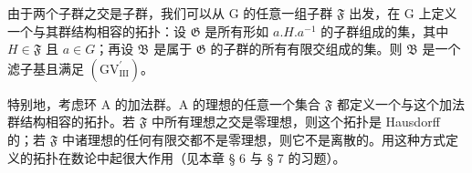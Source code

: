 由于两个子群之交是子群，我们可以从 G 的任意一组子群 \(\mathfrak{F}\) 出发，在 G 上定义一个与其群结构相容的拓扑：设 \(\mathfrak{G}\) 是所有形如 \(a.H.a^{-1}\) 的子群组成的集，其中 \(H\in\mathfrak{F}\) 且 \(a\in G\)；再设 \(\mathfrak{B}\) 是属于 \(\mathfrak{G}\) 的子群的所有有限交组成的集。则 \(\mathfrak{B}\) 是一个滤子基且满足 \((\mathrm{GV}_{\mathrm{III}}^{\prime})\)。

特别地，考虑环 A 的加法群。A 的理想的任意一个集合 \(\mathfrak{F}\) 都定义一个与这个加法群结构相容的拓扑。若 \(\mathfrak{F}\) 中所有理想之交是零理想，则这个拓扑是 Hausdorff 的；若 \(\mathfrak{F}\) 中诸理想的任何有限交都不是零理想，则它不是离散的。用这种方式定义的拓扑在数论中起很大作用（见本章 § 6 与 § 7 的习题）。

